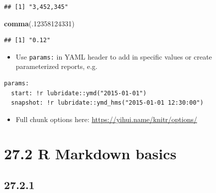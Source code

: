 \documentclass[]{book}
\newenvironment{Shaded}{\begin{snugshade}}{\end{snugshade}}
\newcommand{\DecValTok}[1]{\textcolor[rgb]{0.00,0.00,0.81}{#1}}
\newcommand{\KeywordTok}[1]{\textcolor[rgb]{0.13,0.29,0.53}{\textbf{#1}}}
\newcommand{\NormalTok}[1]{#1}
\providecommand{\tightlist}{%
  \setlength{\itemsep}{0pt}\setlength{\parskip}{0pt}}
\theoremstyle{definition}
\theoremstyle{definition}
\theoremstyle{definition}
\theoremstyle{remark}
\begin{document}
\begin{verbatim}
## [1] "3,452,345"
\end{verbatim}

\begin{Shaded}
\begin{Highlighting}[]
\KeywordTok{comma}\NormalTok{(.}\DecValTok{12358124331}\NormalTok{)}
\end{Highlighting}
\end{Shaded}

\begin{verbatim}
## [1] "0.12"
\end{verbatim}

\begin{itemize}
\tightlist
\item
  Use \texttt{params:} in YAML header to add in specific values or
  create parameterized reports, e.g.
\end{itemize}

\begin{verbatim}
params:
  start: !r lubridate::ymd("2015-01-01")
  snapshot: !r lubridate::ymd_hms("2015-01-01 12:30:00")
\end{verbatim}

\begin{itemize}
\tightlist
\item
  Full chunk options here: \url{https://yihui.name/knitr/options/}
\end{itemize}

\hypertarget{r-markdown-basics}{%
\section{27.2 R Markdown basics}\label{r-markdown-basics}}

\hypertarget{section-92}{%
\subsection{27.2.1}\label{section-92}}
\end{document}
